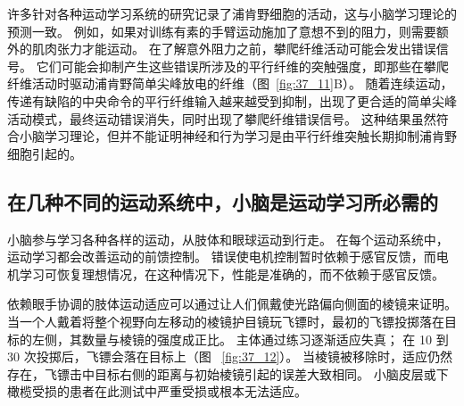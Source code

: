 许多针对各种运动学习系统的研究记录了浦肯野细胞的活动，这与小脑学习理论的预测一致。
例如，如果对训练有素的手臂运动施加了意想不到的阻力，则需要额外的肌肉张力才能运动。
在了解意外阻力之前，攀爬纤维活动可能会发出错误信号。
它们可能会抑制产生这些错误所涉及的平行纤维的突触强度，即那些在攀爬纤维活动时驱动浦肯野简单尖峰放电的纤维（图~\ref{fig:37_11}B）。
随着连续运动，传递有缺陷的中央命令的平行纤维输入越来越受到抑制，出现了更合适的简单尖峰活动模式，最终运动错误消失，同时出现了攀爬纤维错误信号。
这种结果虽然符合小脑学习理论，但并不能证明神经和行为学习是由平行纤维突触长期抑制浦肯野细胞引起的。



\subsection{在几种不同的运动系统中，小脑是运动学习所必需的}

小脑参与学习各种各样的运动，从肢体和眼球运动到行走。
在每个运动系统中，运动学习都会改善运动的前馈控制。
错误使电机控制暂时依赖于感官反馈，而电机学习可恢复理想情况，在这种情况下，性能是准确的，而不依赖于感官反馈。


依赖眼手协调的肢体运动适应可以通过让人们佩戴使光路偏向侧面的棱镜来证明。
当一个人戴着将整个视野向左移动的棱镜护目镜玩飞镖时，最初的飞镖投掷落在目标的左侧，其数量与棱镜的强度成正比。
主体通过练习逐渐适应失真；
在 10 到 30 次投掷后，飞镖会落在目标上（图 ~\ref{fig:37_12}）。
当棱镜被移除时，适应仍然存在，飞镖击中目标右侧的距离与初始棱镜引起的误差大致相同。
小脑皮层或下橄榄受损的患者在此测试中严重受损或根本无法适应。


